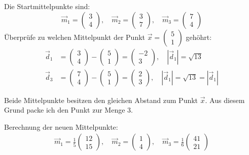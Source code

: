 \documentclass[11pt]{article}
\begin{document}
Die Startmittelpunkte sind: \[
 \vec{m}_1 = \begin{pmatrix} 3 \\ 4 \end{pmatrix}, \quad \vec{m}_2 = \begin{pmatrix} 3 \\ 7 \end{pmatrix}, \quad \vec{m}_3 = \begin{pmatrix} 7 \\ 4 \end{pmatrix}
\] Überprüfe zu welchen Mittelpunkt der Punkt
\(\vec{x} = \begin{pmatrix} 5 \\ 1 \end{pmatrix}\) gehöhrt:
\[\begin{aligned}
\vec{d}_1 &= \begin{pmatrix} 3 \\ 4 \end{pmatrix} -  \begin{pmatrix} 5 \\ 1 \end{pmatrix} =  \begin{pmatrix} -2 \\ 3 \end{pmatrix}, \quad \left| \vec{d}_1 \right| = \sqrt{13} \\
\vec{d}_3 &= \begin{pmatrix} 7 \\ 4 \end{pmatrix} -  \begin{pmatrix} 5 \\ 1 \end{pmatrix} =  \begin{pmatrix} 2 \\ 3 \end{pmatrix}, \quad \left| \vec{d}_1 \right| = \sqrt{13} = \left| \vec{d}_1 \right|
\end{aligned}\]

Beide Mittelpunkte besitzen den gleichen Abstand zum Punkt \(\vec{x}\).
Aus diesem Grund packe ich den Punkt zur Menge \(3\).

Berechnung der neuen Mittelpunkte: \[ \begin{aligned}
\vec{m}_1 = \frac{1}{5} \begin{pmatrix} 12 \\ 15 \end{pmatrix}, \quad 
\vec{m}_2 = \begin{pmatrix} 1 \\ 4 \end{pmatrix}, \quad 
\vec{m}_3 = \frac{1}{6} \begin{pmatrix} 41 \\ 21 \end{pmatrix} 
\end{aligned} \]
\end{document}
